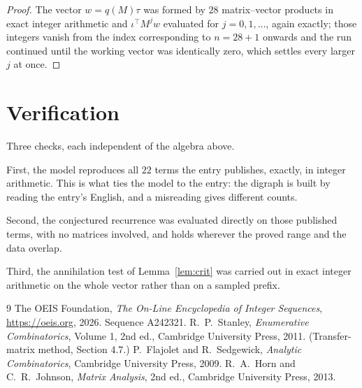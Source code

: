 \documentclass[11pt,a4paper]{article}
\theoremstyle{plain}
\theoremstyle{definition}
\begin{document}
\begin{proof}
The vector $w=q(M)\tau$ was formed by $28$ matrix--vector products in exact integer
arithmetic and $\iota^{\!\top}M^{j}w$ evaluated for $j=0,1,\dots$, again exactly; those
integers vanish from the index corresponding to $n=28+1$ onwards and the run continued
until the working vector was identically zero, which settles every larger $j$ at once.
\end{proof}

\section{Verification}

Three checks, each independent of the algebra above.

First, the model reproduces all $22$ terms the entry publishes, exactly, in integer
arithmetic. This is what ties the model to the entry: the digraph is built by reading the
entry's English, and a misreading gives different counts.

Second, the conjectured recurrence was evaluated directly on those published terms, with no
matrices involved, and holds wherever the proved range and the data overlap.

Third, the annihilation test of Lemma~\ref{lem:crit} was carried out in exact integer
arithmetic on the whole vector rather than on a sampled prefix.

\begin{thebibliography}{9}
 The OEIS Foundation, \emph{The On-Line Encyclopedia of Integer
Sequences}, \url{https://oeis.org}, 2026. Sequence A242321.
 R.~P.~Stanley, \emph{Enumerative Combinatorics}, Volume 1, 2nd ed.,
Cambridge University Press, 2011. (Transfer-matrix method, Section 4.7.)
 P.~Flajolet and R.~Sedgewick, \emph{Analytic Combinatorics}, Cambridge
University Press, 2009.
 R.~A.~Horn and C.~R.~Johnson, \emph{Matrix Analysis}, 2nd ed., Cambridge
University Press, 2013.
\end{thebibliography}
\end{document}
